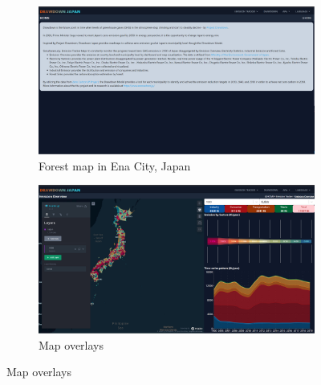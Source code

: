 \begin{figure}[p]
  \centering
  \begin{subfigure}{.5\textwidth}
      \centering
      \includegraphics[width=.9\textwidth]{figs/chap7/home.png}
      \caption{Forest map in Ena City, Japan}
  \end{subfigure}%
  \begin{subfigure}{.5\textwidth}
      \centering
      \includegraphics[width=.9\textwidth]{figs/chap7/ems_overview.png}
      \caption{Map overlays}
  \end{subfigure}


\end{figure}
